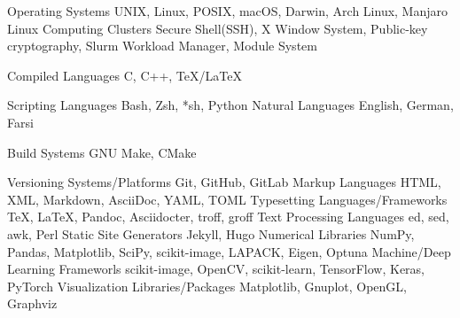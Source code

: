 

\begin{cvskills}

  \cvskill
    {Operating Systems} %
    {UNIX\textregistered, Linux, POSIX\textregistered, macOS\textregistered, Darwin\textregistered, Arch Linux, Manjaro Linux} %
  \cvskill
    {Computing Clusters} %
    {Secure Shell(SSH), X Window System, Public-key cryptography, Slurm Workload Manager, Module System} %

  \cvskill
    {Compiled Languages} %
    {C, C++, \TeX/\LaTeX} %

  \cvskill
    {Scripting Languages} %
    {Bash, Zsh, *sh, Python} %
  \cvskill
    {Natural Languages} %
    {English, German, Farsi} %

  \cvskill
    {Build Systems} %
    {GNU Make, CMake} %

  \cvskill
    {Versioning Systems/Platforms} %
    {Git, GitHub, GitLab} %
  \cvskill
    {Markup Languages} %
    {HTML, XML, Markdown, AsciiDoc, YAML, TOML}
  \cvskill
    {Typesetting Languages/Frameworks} %
    {\TeX, \LaTeX, Pandoc, Asciidocter, troff, groff}
  \cvskill
    {Text Processing Languages} %
    {ed, sed, awk, Perl}
  \cvskill
    {Static Site Generators} %
    {Jekyll, Hugo} %
  \cvskill
    {Numerical Libraries} %
    {NumPy, Pandas, Matplotlib, SciPy, scikit-image, LAPACK, Eigen, Optuna} %
  \cvskill
    {Machine/Deep Learning Frameworls} %
    {scikit-image, OpenCV, scikit-learn, TensorFlow, Keras, PyTorch} %
  \cvskill
    {Visualization Libraries/Packages} %
    {Matplotlib, Gnuplot, OpenGL, Graphviz} %


\end{cvskills}
